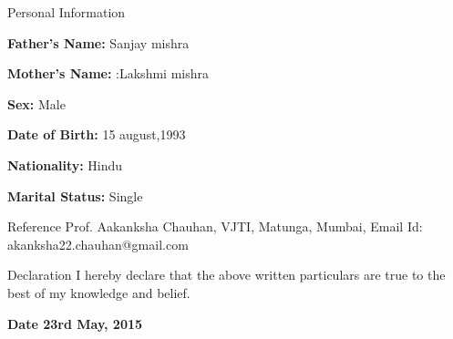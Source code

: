 \documentclass{resume} %
\begin{document}
\begin{rSection}{Personal Information}
	\item \textbf{Father’s Name:} Sanjay mishra
	\item \textbf{Mother’s Name: } :Lakshmi mishra
	\item \textbf{Sex:} Male
	\item \textbf{Date of Birth:} 15 august,1993 
	\item \textbf{Nationality: } Hindu
	\item \textbf{Marital Status:}	Single
\end{rSection}
\newpage
\begin{rSection}{Reference}
		Prof. Aakanksha Chauhan,
		\newline
		VJTI, Matunga, Mumbai,
		\newline
		Email Id: akanksha22.chauhan@gmail.com
		
\end{rSection}
\begin{rSection}{Declaration}
	I hereby declare that the above written particulars are true to the best of my knowledge and belief.
\end{rSection}
\begin{rSection}
	\bf Date 23rd May, 2015
\end{rSection}
\end{document}
